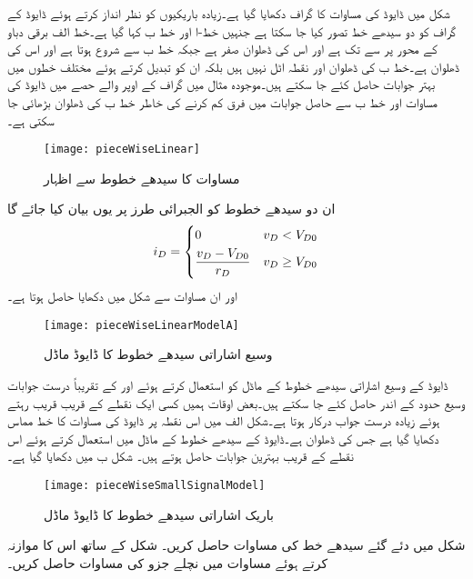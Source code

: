 شکل  میں ڈایوڈ کی مساوات کا گراف دکھایا گیا ہے۔زیادہ باریکیوں کو نظر انداز کرتے ہوئے ڈایوڈ کے گراف کو دو سیدھے خط تصور کیا جا سکتا ہے جنہیں خط-ا اور خط  ب کہا گیا ہے۔خط  الف برقی دباو کے محور پر    سے    تک ہے اور اس کی ڈھلوان صفر ہے جبکہ خط  ب    سے شروع ہوتا ہے اور اس کی ڈھلوان   ہے۔خط  ب کی ڈھلوان اور نقطہ   اٹل نہیں ہیں بلکہ ان کو تبدیل کرتے ہوئے مختلف خطوں میں بہتر جوابات حاصل کئے جا سکتے ہیں۔موجودہ مثال میں گراف کے اوپر والے حصے میں ڈایوڈ کی مساوات اور خط  ب سے حاصل جوابات میں فرق کم کرنے کی خاطر خط  ب کی ڈھلوان بڑھائی جا سکتی ہے۔
\begin{figure}
\centering
\texttt{[image: pieceWiseLinear]}
\caption{مساوات کا سیدھے خطوط سے اظہار}
\label{شکل_مساوات_کا_سیدھے_خطوط_سے_اظہار}
\end{figure}
ان دو سیدھے خطوط کو الجبرائی طرز پر یوں بیان کیا جائے گا
\begin{align} \label{مساوات_ڈایوڈ_سیدھے_خطوط}
i_D=
\begin{dcases}
0 & v_D < V_{D0}  \\
\frac{v_D-V_{D0}}{r_D} & v_D \geq V_{D0} 
\end{dcases}
\end{align}
اور ان مساوات سے شکل   میں دکھایا   حاصل ہوتا ہے۔
\begin{figure}
\centering
\texttt{[image: pieceWiseLinearModelA]}
\caption{وسیع اشاراتی سیدھے خطوط کا ڈایوڈ ماڈل}
\label{شکل_سیدھے_خطوط_کا_ماڈل}
\end{figure}
ڈایوڈ کے وسیع اشاراتی سیدھے خطوط کے ماڈل کو استعمال کرتے ہوئے  اور  کے تقریباً درست جوابات وسیع حدود کے اندر حاصل کئے جا سکتے ہیں۔بعض اوقات ہمیں کسی ایک نقطے کے قریب قریب رہتے ہوئے زیادہ درست جواب درکار ہوتا ہے۔شکل  الف میں اس نقطہ  پر ڈایوڈ کی مساوات کا خط مماس دکھایا گیا ہے جس کی ڈھلوان  ہے۔ڈایوڈ کے سیدھے خطوط کے ماڈل میں  استعمال کرتے ہوئے اس نقطے کے قریب بہترین جوابات حاصل ہوتے ہیں۔ شکل  ب میں دکھایا گیا ہے۔
\begin{figure}
\centering
\texttt{[image: pieceWiseSmallSignalModel]}
\caption{باریک اشاراتی سیدھے خطوط کا ڈایوڈ ماڈل}
\label{شکل_باریک_اشاراتی_سیدھے_خطوط_کا_ماڈل}
\end{figure}
  
شکل   میں دئے گئے سیدھے خط کی مساوات حاصل کریں۔ شکل   کے ساتھ اس کا موازنہ کرتے ہوئے مساوات   میں نچلے جزو کی مساوات حاصل کریں۔

